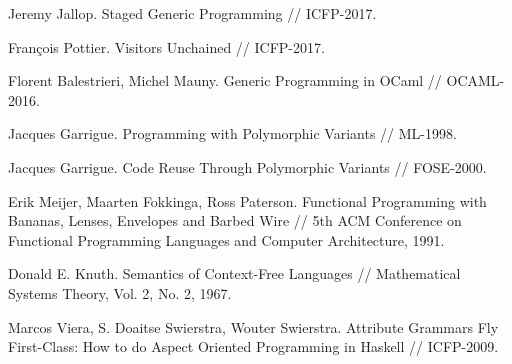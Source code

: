 \documentclass[twocolumn,8pt]{extarticle}
\begin{document}
{\footnotesize
\begin{thebibliography}{99}
 Jeremy Jallop. Staged Generic Programming // ICFP-2017.

Fran\c{c}ois Pottier. Visitors Unchained // ICFP-2017.

Florent Balestrieri, Michel Mauny. Generic Programming in OCaml // OCAML-2016.

Jacques Garrigue. Programming with Polymorphic Variants // ML-1998.

Jacques Garrigue. Code Reuse Through Polymorphic Variants // FOSE-2000.


Erik Meijer, Maarten Fokkinga, Ross Paterson. Functional Programming with Bananas, Lenses, 
Envelopes and Barbed Wire // 5th ACM Conference on Functional Programming Languages and 
Computer Architecture, 1991.

Donald E. Knuth. Semantics of Context-Free Languages //
Mathematical Systems Theory, Vol. 2, No. 2, 1967.

Marcos Viera, S. Doaitse Swierstra, Wouter Swierstra.
Attribute Grammars Fly First-Class: How to do Aspect Oriented Programming in Haskell //
ICFP-2009.









\end{thebibliography}}
\end{document}
